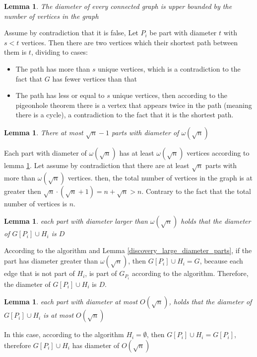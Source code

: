 \documentclass[11pt]{article}
\newtheorem{lemma}[theorem]{Lemma}
\begin{document}
\begin{lemma}
\label{dimater_upper_bound_amount_vertices}
The diameter of every connected graph is upper bounded by the number of vertices in the graph
\end{lemma}
 Assume by contradiction that it is false, Let $P_i$ be part with diameter $t$ with $s < t$ vertices. Then there are two vertices which their shortest path between them is $t$, dividing to cases:
\begin{itemize}
    \item The path has more than $s$ unique vertices, which is a contradiction to the fact that $G$ has fewer vertices than that
    \item The path has less or equal to $s$ unique vertices, then according to the pigeonhole theorem there is a vertex that appears twice in the path (meaning there is a cycle), a contradiction to the fact that it is the shortest path. 
\end{itemize}


\begin{lemma}
\label{parts_bound_amount}
There at most $\sqrt{n} -1 $ parts with diameter of $\omega(\sqrt{n})$
\end{lemma}
Each part with diameter of $\omega(\sqrt{n})$ has at least $\omega(\sqrt{n})$ vertices according to lemma \ref{dimater_upper_bound_amount_vertices}.
Let assume by contradiction that there are at least $\sqrt{n}$ parts with more than $\omega(\sqrt{n})$ vertices. then, the total number of vertices in the graph is at greater then $\sqrt{n}  \cdot  (\sqrt{n} +1 )= n + \sqrt{n} > n$. Contrary to the fact that the total number of vertices is $n$.


\begin{lemma}
\label{parts_dimater_D}
each part with diameter larger than $\omega(\sqrt{n})$ holds that the diameter of $G[P_i] \cup H_i$ is $D$
\end{lemma}
According to the algorithm and Lemma \ref{discovery_large_diameter_parts}, if the part has diameter greater than $\omega({\sqrt{n}})$, then $G[P_i] \cup H_i = G$, because each edge that is not part of $H_i$, is part of $G_{P_{i}}$ according to the algorithm. Therefore, the diameter of $G[P_i] \cup H_i$ is $D$.


\begin{lemma}
\label{parts_dimater_sqrt_n}
each part with diameter at most $O(\sqrt{n})$, holds that the diameter of $G[P_i] \cup H_i$ is at most $O(\sqrt{n})$
\end{lemma}
In this case, according to the algorithm $H_i = \emptyset$, then $G[P_i] \cup H_i = G[P_i]$, therefore $G[P_i] \cup H_i$ has diameter of $O(\sqrt{n})$
\end{document}
